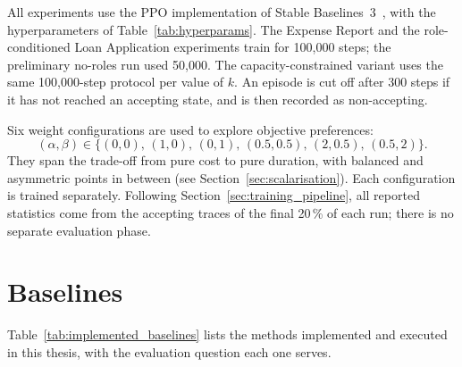 All experiments use the \ac{PPO} implementation of Stable
Baselines~3~\cite{Raffin2021Stable-Baselines3:Implementations}, with the hyperparameters of
Table~\ref{tab:hyperparams}. The Expense Report and the role-conditioned
Loan Application experiments train for 100{,}000 steps; the preliminary
no-roles run used 50{,}000. The capacity-constrained variant uses the
same 100{,}000-step protocol per value of $k$. An episode is cut off
after 300 steps if it has not reached an accepting state, and is then
recorded as non-accepting.

Six weight configurations are used to explore objective preferences:
\[
(\alpha,\beta) \in
\{(0,0),\,(1,0),\,(0,1),\,(0.5,0.5),\,(2,0.5),\,(0.5,2)\}.
\]
They span the trade-off from pure cost to pure duration, with balanced
and asymmetric points in between (see
Section~\ref{sec:scalarisation}). Each configuration is trained
separately. Following Section~\ref{sec:training_pipeline}, all reported
statistics come from the accepting traces of the final 20\,\% of each
run; there is no separate evaluation phase.

\section{Baselines}
\label{sec:baselines}

Table~\ref{tab:implemented_baselines} lists the methods implemented and
executed in this thesis, with the evaluation question each one serves.

